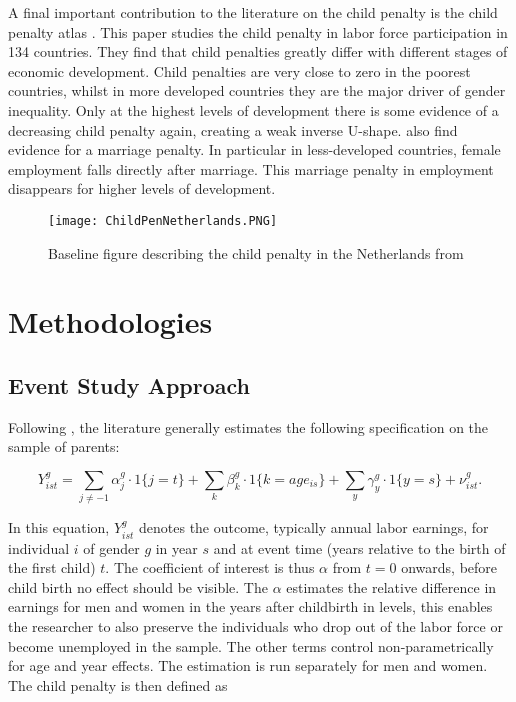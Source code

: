 \documentclass[10pt]{article}
\begin{document}
A final important contribution to the literature on the child penalty is the child penalty atlas \citep{kleven2023child}. This paper studies the child penalty in labor force participation in 134 countries. They find that child penalties greatly differ with different stages of economic development. Child penalties are very close to zero in the poorest countries, whilst in more developed countries they are the major driver of gender inequality. Only at the highest levels of development there is some evidence of a decreasing child penalty again, creating a weak inverse U-shape. \cite{kleven2023child} also find evidence for a marriage penalty. In particular in less-developed countries, female employment falls directly after marriage. This marriage penalty in employment disappears for higher levels of development.

\begin{figure}
    \centering
    \texttt{[image: ChildPenNetherlands.PNG]}
    \caption{Baseline figure describing the child penalty in the Netherlands from \cite{rabate2022determines}}
    \label{fig:cpned}
\end{figure}

\section{Methodologies}

\subsection{Event Study Approach}
Following \cite{kleven2019children}, the literature generally estimates the following specification on the sample of parents:

\begin{equation}
\label{eq: child pen}
    Y^g_{ist} = \sum_{j \neq -1} \alpha_j^g \cdot 1\{j=t\} + \sum_k \beta^g_k \cdot 1\{k=age_{is}\} + \sum_y \gamma^g_y \cdot 1\{y=s\} + \nu^g_{ist}.
\end{equation}

In this equation, $ Y^g_{ist}$ denotes the outcome, typically annual labor earnings, for individual $i$ of gender $g$ in year $s$ and at event time (years relative to the birth of the first child) $t$. The coefficient of interest is thus $\alpha$ from $t=0$ onwards, before child birth no effect should be visible. The $\alpha$ estimates the relative difference in earnings for men and women in the years after childbirth in levels, this enables the researcher to also preserve the individuals who drop out of the labor force or become unemployed in the sample. The other terms control non-parametrically for age and year effects. The estimation is run separately for men and women. The child penalty is then defined as
\end{document}
